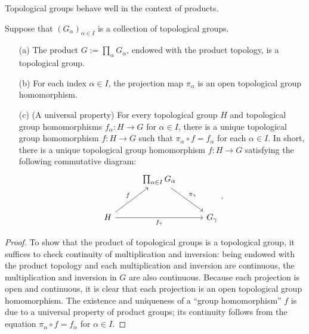 Topological groups behave well in the context of products.
\begin{prop}
    Suppose that $(G_\alpha)_{\alpha\in I}$ is a collection of topological groups.
    \begin{enumerate}
        \item[(a)]
        {
            The product $G:=\prod_\alpha G_\alpha$, endowed with the product topology, is a topological group.
        }
        \item[(b)]
        {
            For each index $\alpha\in I$, the projection map $\pi_\alpha$ is an open topological group homomorphism.
        }
        \item[(c)]
        {
            (A universal property)
            For every topological group $H$ and topological group homomorphisms $f_\alpha: H\rightarrow G$ for $\alpha\in I$, there is a unique topological group homomorphism $f: H\rightarrow G$ such that $\pi_\alpha\circ f=f_\alpha$ for each $\alpha\in I$.
            In short, there is a unique topological group homomorphism $f: H\rightarrow G$ satisfying the following commutative diagram:
            \begin{equation*}
            \begin{tikzcd}[row sep=1.0cm, column sep=1.0cm]
                &
                \prod_{\alpha\in I} G_\alpha
                \arrow[dr, "\pi_\gamma"]
                &\\
                H\arrow[ur, "f"]\arrow[rr, "f_\gamma"']
                &
                &
                G_\gamma
            \end{tikzcd}.
            \end{equation*}
        }
    \end{enumerate}
\end{prop}
\begin{proof}
    To show that the product of topological groups is a topological group, it suffices to check continuity of multiplication and inversion: being endowed with the product topology and each multiplication and inversion are continuous, the multiplication and inversion in $G$ are also continuous.
    Because each projection is open and continuous, it is clear that each projection is an open topological group homomorphism.
    The existence and uniqueness of a ``group homomorphism'' $f$ is due to a universal property of product groups; its continuity follows from the equation $\pi_\alpha\circ f=f_\alpha$ for $\alpha\in I$.
\end{proof}

